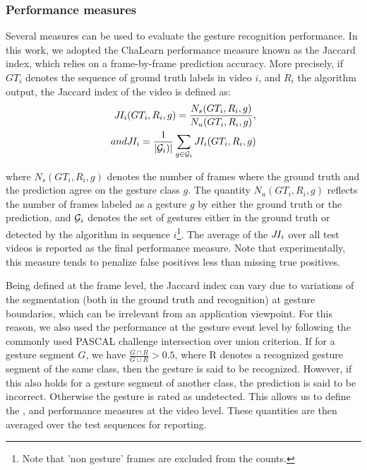 \subsubsection{Performance measures}

Several measures can be used to evaluate the gesture recognition performance.
%
In this work, we adopted the ChaLearn performance measure known as the Jaccard index, which relies on a frame-by-frame prediction accuracy.
More precisely, if $GT_i$ denotes the sequence of ground truth labels in video $i$, and $R_i$ the algorithm output, the Jaccard index
of the video is defined as:
\begin{align}
\jaccardindex_i(GT_i, R_i,g) = \frac{N_s(GT_i, R_i,g)}{N_u(GT_i, R_i,g)},
\\
\mbox{and } \jaccardindex_i = \frac{1}{|{\cal G}_i)|} \sum_{g \in {\cal G}_i} \jaccardindex_i(GT_i, R_i,g)
\end{align}

where $N_s(GT_i, R_i, g)$ denotes the number of frames where the ground truth and the prediction agree on the gesture class $g$. The quantity
$N_u(GT_i, R_i, g)$ reflects the number of frames labeled as a gesture $g$ by  either the ground truth or the prediction,
and ${{\cal G}_i}$ denotes the set of gestures either in the ground truth or detected by the algorithm in sequence $i$\footnote{Note that 'non gesture' frames are excluded from the counts.}. The average of the $J\hspace*{-0.1em}I_i$ over all test videos is reported as the final performance measure.
%
Note that experimentally, this measure tends to penalize false positives less than missing true positives.

Being defined at the frame level, the Jaccard index can vary due to variations of the segmentation (both in the ground truth and recognition)
at gesture boundaries, which can be irrelevant from an application viewpoint.
%
For this reason, we also used the performance at the gesture event level by following the commonly used PASCAL challenge intersection over union criterion.
If for a gesture segment $G$, we have $\frac{G \cap R}{G \cup R} >  0.5$, where R denotes a recognized gesture segment of the same class, then the  gesture is said to be recognized.
%
However, if this also holds for a gesture segment of another class, the prediction is said to be incorrect.
Otherwise the gesture is rated as undetected. This allows us to define the \eventaccuracy, \eventconfused and \eventmissed performance measures at the video level. 
These quantities are then averaged over the test sequences for reporting.


